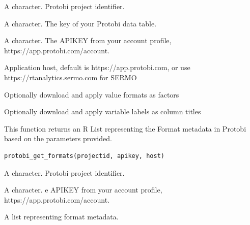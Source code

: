 \documentclass[a4paper]{book}
\begin{document}
%
\begin{Arguments}
\begin{ldescription}
\item[\code{projectid}] A character. Protobi project identifier.

\item[\code{tablekey}] A character. The key of your Protobi data table.

\item[\code{apikey}] A character. The APIKEY from your account profile, https://app.protobi.com/account.

\item[\code{host}] Application host, default is https://app.protobi.com, or use https://rtanalytics.sermo.com for SERMO

\item[\code{formats}] Optionally download and apply value formats as factors

\item[\code{titles}] Optionally download and apply variable labels as column titles
\end{ldescription}
\end{Arguments}
%
\begin{Description}\relax
This function returns an R List representing the Format metadata in Protobi based on the parameters provided.
\end{Description}
%
\begin{Usage}
\begin{verbatim}
protobi_get_formats(projectid, apikey, host)
\end{verbatim}
\end{Usage}
%
\begin{Arguments}
\begin{ldescription}
\item[\code{projectid}] A character. Protobi project identifier.

\item[\code{apikey}] A character. e APIKEY from your account profile, https://app.protobi.com/account.
\end{ldescription}
\end{Arguments}
%
\begin{Value}
A list representing format metadata.
\end{Value}
\end{document}
